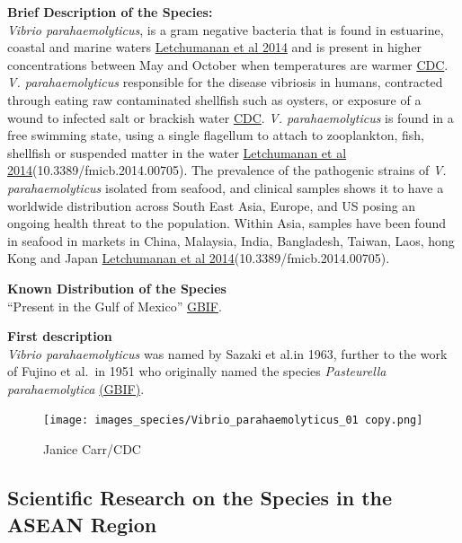 \documentclass[]{book}
\theoremstyle{definition}
\theoremstyle{definition}
\theoremstyle{definition}
\theoremstyle{remark}
\begin{document}
\textbf{Brief Description of the Species:}\\
\emph{Vibrio parahaemolyticus}, is a gram negative bacteria that is
found in estuarine, coastal and marine waters
\href{https://www.ncbi.nlm.nih.gov/pmc/articles/PMC4263241/}{Letchumanan
et al 2014} and is present in higher concentrations between May and
October when temperatures are warmer
\href{https://www.cdc.gov/vibrio/faq.html}{CDC}. \emph{V.
parahaemolyticus} responsible for the disease vibriosis in humans,
contracted through eating raw contaminated shellfish such as oysters, or
exposure of a wound to infected salt or brackish water
\href{https://www.cdc.gov/vibrio/faq.html}{CDC}. \emph{V.
parahaemolyticus} is found in a free swimming state, using a single
flagellum to attach to zooplankton, fish, shellfish or suspended matter
in the water
\href{https://www.ncbi.nlm.nih.gov/pmc/articles/PMC4263241/}{Letchumanan
et al 2014}(10.3389/fmicb.2014.00705). The prevalence of the pathogenic
strains of \emph{V. parahaemolyticus} isolated from seafood, and
clinical samples shows it to have a worldwide distribution across South
East Asia, Europe, and US posing an ongoing health threat to the
population. Within Asia, samples have been found in seafood in markets
in China, Malaysia, India, Bangladesh, Taiwan, Laos, hong Kong and Japan
\href{https://www.ncbi.nlm.nih.gov/pmc/articles/PMC4263241/}{Letchumanan
et al 2014}(10.3389/fmicb.2014.00705).

\textbf{Known Distribution of the Species}\\
``Present in the Gulf of Mexico''
\href{http://www.gbif.org/species/5427673}{GBIF}.

\textbf{First description}\\
\emph{Vibrio parahaemolyticus} was named by Sazaki et al.in 1963,
further to the work of Fujino et al.~in 1951 who originally named the
species \emph{Pasteurella parahaemolytica}
\href{https://www.gbif.org/species/5427673}{(GBIF)}.

\begin{figure}
\centering
\texttt{[image: images\_species/Vibrio\_parahaemolyticus\_01 copy.png]}
\caption{Janice Carr/CDC}
\end{figure}

\hypertarget{scientific-research-on-the-species-in-the-asean-region-6}{%
\subsection{Scientific Research on the Species in the ASEAN
Region}\label{scientific-research-on-the-species-in-the-asean-region-6}}
\end{document}
